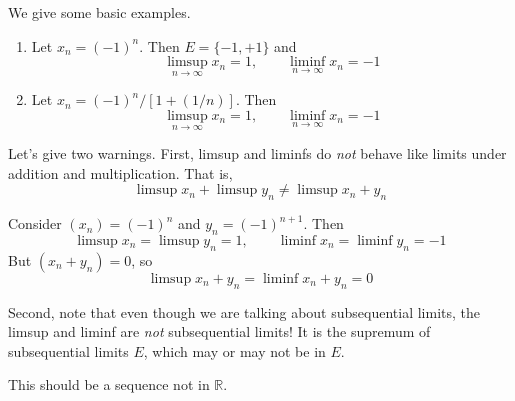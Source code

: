   \begin{example}
    \label{ex:computing-limsup-and-liminf}
    We give some basic examples. 
    \begin{enumerate}
      \item Let $x_n = (-1)^n$. Then $E = \{-1, +1\}$ and 
      \begin{equation}
        \limsup_{n \rightarrow \infty} x_n = 1, \qquad \liminf_{n \rightarrow \infty} x_n = -1 
      \end{equation}

      \item Let $x_n = (-1)^n / [1 + (1/n)]$. Then 
      \begin{equation}
        \limsup_{n \rightarrow \infty} x_n = 1, \qquad \liminf_{n \rightarrow \infty} x_n = -1
      \end{equation}
    \end{enumerate}
  \end{example}

  Let's give two warnings. First, limsup and liminfs do \textit{not} behave like limits under addition and multiplication. That is, 
  \begin{equation}
    \limsup x_n + \limsup y_n \neq \limsup x_n + y_n 
  \end{equation}

  \begin{example}
    \label{ex:counterexamples-of-arithmetic-consistency-of}
    Consider $(x_n) = (-1)^n$ and $y_n = (-1)^{n+1}$. Then 
    \begin{equation}
      \limsup x_n = \limsup y_n = 1, \qquad \liminf x_n = \liminf y_n = -1
    \end{equation}
    But $(x_n + y_n) = 0$, so 
    \begin{equation}
      \limsup x_n + y_n = \liminf x_n + y_n = 0 
    \end{equation}
  \end{example}

  Second, note that even though we are talking about subsequential limits, the limsup and liminf are \textit{not} subsequential limits! It is the supremum of subsequential limits $E$, which may or may not be in $E$. 

  \begin{example}
    \label{ex:limsup-that-is-not-attained-by-any}
    This should be a sequence not in $\mathbb{R}$. 
  \end{example}

